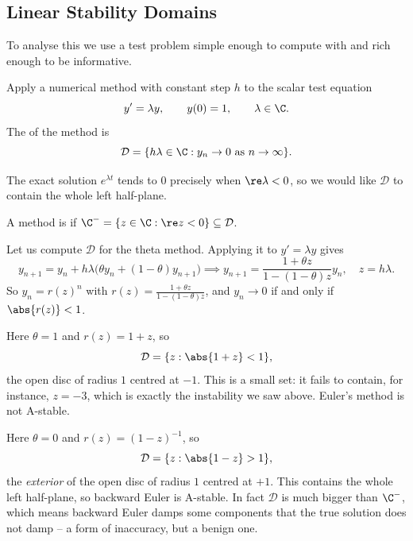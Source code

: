 \subsection{Linear Stability Domains}

To analyse this we use a test problem simple enough to compute with and rich enough to be informative.

\begin{definition}
  Apply a numerical method with constant step $h$ to the scalar test equation
  $$
  y' = \lambda y, \qquad y(0) = 1, \qquad \lambda \in \C .
  $$
  The  of the method is
  $$
  \mathcal{D} = \{ h\lambda \in \C : y_n \to 0 \text{ as } n \to \infty\}.
  $$
\end{definition}

The exact solution $e^{\lambda t}$ tends to $0$ precisely when $\re\lambda < 0$, so we would like $\mathcal{D}$ to contain the whole left half-plane.

\begin{definition}[A-stability]
  A method is  if $\C^- = \{z \in \C : \re z < 0\} \subseteq \mathcal{D}$.
\end{definition}

Let us compute $\mathcal{D}$ for the theta method. Applying it to $y' = \lambda y$ gives
$$
y_{n+1} = y_n + h\lambda\big(\theta y_n + (1-\theta)y_{n+1}\big) \implies y_{n+1} = \frac{1 + \theta z}{1 - (1-\theta)z}y_n, \quad z = h\lambda .
$$
So $y_n = r(z)^n$ with $r(z) = \frac{1+\theta z}{1 - (1-\theta)z}$, and $y_n \to 0$ if and only if $\abs{r(z)} < 1$.

\begin{example}
  Here $\theta = 1$ and $r(z) = 1 + z$, so
  $$
  \mathcal{D} = \{z : \abs{1 + z} < 1\},
  $$
  the open disc of radius $1$ centred at $-1$. This is a small set: it fails to contain, for instance, $z = -3$, which is exactly the instability we saw above. Euler's method is not A-stable.
\end{example}

\begin{example}
  Here $\theta = 0$ and $r(z) = (1-z)^{-1}$, so
  $$
  \mathcal{D} = \{z : \abs{1 - z} > 1\},
  $$
  the \emph{exterior} of the open disc of radius $1$ centred at $+1$. This contains the whole left half-plane, so backward Euler is A-stable. In fact $\mathcal{D}$ is much bigger than $\C^-$, which means backward Euler damps some components that the true solution does not damp -- a form of inaccuracy, but a benign one.
\end{example}

